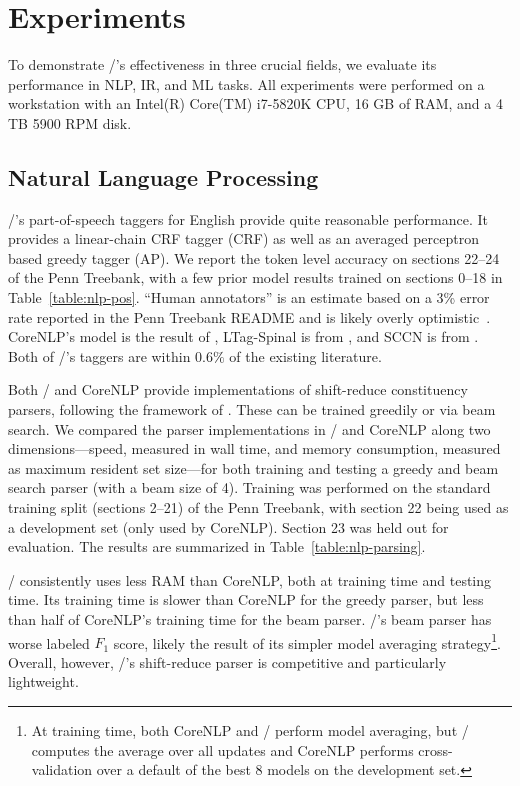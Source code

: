 \section{Experiments}
\label{sec:experiments}

To demonstrate \meta/'s effectiveness in three crucial fields, we evaluate its
performance in NLP, IR, and ML tasks. All experiments were performed on a
workstation with an Intel(R) Core(TM) i7-5820K CPU, 16 GB of RAM, and a 4
TB 5900 RPM disk.

\subsection{Natural Language Processing}



\meta/'s part-of-speech taggers for English provide quite reasonable
performance. It provides a linear-chain CRF tagger (CRF) as well as an
averaged perceptron based greedy tagger (AP). We report the token level
accuracy on sections 22--24 of the Penn Treebank, with a few prior model
results trained on sections 0--18 in Table~\ref{table:nlp-pos}. ``Human
annotators'' is an estimate based on a 3\% error rate reported in the Penn
Treebank README and is likely overly
optimistic~\citep{Manning:2011:CICLing}. CoreNLP's model is the result of
\citet{Manning:2011:CICLing}, LTag-Spinal is from
\citet{Shen:2007:ACL}, and SCCN is from \citet{Sogaard:2011:ACL-HLT}.
Both of \meta/'s taggers are within $0.6\%$ of the existing literature.



Both \meta/ and CoreNLP provide implementations of shift-reduce
constituency parsers, following the framework of \citet{const-parsing}.
These can be trained greedily or via beam search. We compared the parser
implementations in \meta/ and CoreNLP along two dimensions---speed,
measured in wall time, and memory consumption, measured as maximum resident
set size---for both training and testing a greedy and beam search parser
(with a beam size of 4). Training was performed on the standard training
split (sections 2--21) of the Penn Treebank, with section 22 being used as
a development set (only used by CoreNLP). Section 23 was held out for
evaluation. The results are summarized in Table~\ref{table:nlp-parsing}.

\meta/ consistently uses less RAM than CoreNLP, both at training
time and testing time. Its training time is slower than CoreNLP
for the greedy parser, but less than half of CoreNLP's training time for
the beam parser. \meta/'s beam parser has worse labeled $F_1$ score, likely
the result of its simpler model averaging strategy\footnote{At training
time, both CoreNLP and \meta/ perform model averaging, but \meta/
computes the average over all updates and CoreNLP performs
cross-validation over a default of the best 8 models on the development
set.}. Overall, however, \meta/'s shift-reduce parser is competitive and
particularly lightweight.

